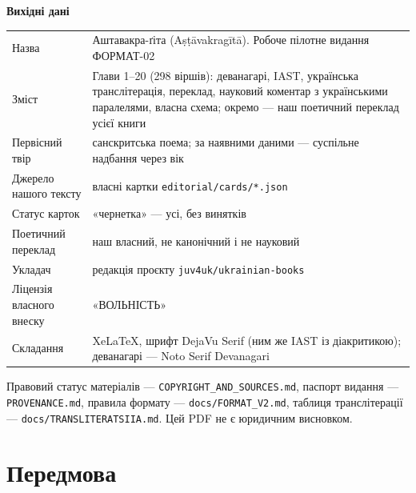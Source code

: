 \documentclass[10pt,a5paper,openany]{book}
\begin{document}
\thispagestyle{empty}
\vspace*{\fill}
\begingroup\small
\noindent\textbf{\sffamily Вихідні дані}

\vspace{0.8em}
\noindent
\begin{tabular}{@{}p{}p{}@{}}
\textsf{Назва} & Аштавакра-ґіта (Aṣṭāvakragītā). Робоче пілотне видання ФОРМАТ-02 \\[0.3em]
\textsf{Зміст} & Глави 1–20 (298 віршів): деванагарі, IAST, українська транслітерація, переклад,
науковий коментар з українськими паралелями, власна схема; окремо — наш поетичний
переклад усієї книги \\[0.3em]
\textsf{Первісний твір} & санскритська поема; за наявними даними — суспільне надбання через вік \\[0.3em]
\textsf{Джерело нашого тексту} & власні картки \texttt{editorial/cards/*.json} \\[0.3em]
\textsf{Статус карток} & «чернетка» — усі, без винятків \\[0.3em]
\textsf{Поетичний переклад} & наш власний, не канонічний і не науковий \\[0.3em]
\textsf{Укладач} & редакція проєкту \texttt{juv4uk/ukrainian-books} \\[0.3em]
\textsf{Ліцензія власного внеску} & «ВОЛЬНІСТЬ» \\[0.3em]
\textsf{Складання} & XeLaTeX, шрифт DejaVu Serif (ним же IAST із діакритикою); деванагарі — Noto Serif Devanagari \\[0.3em]
\end{tabular}

\vspace{1.0em}
\noindent\footnotesize
Правовий статус матеріалів — \texttt{COPYRIGHT\_AND\_SOURCES.md}, паспорт
видання — \texttt{PROVENANCE.md}, правила формату — \texttt{docs/FORMAT\_V2.md},
таблиця транслітерації — \texttt{docs/TRANSLITERATSIIA.md}. Цей PDF не є
юридичним висновком.
\endgroup
\vspace*{\fill}

\frontmatter
\pagestyle{headings}
\tableofcontents
\clearpage
\chapter*{Передмова}
\end{document}
